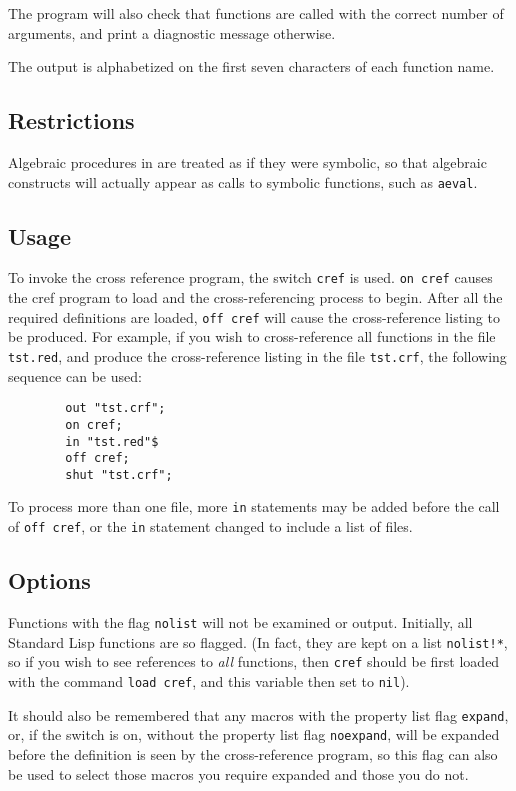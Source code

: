 The program will also check that functions are called with the correct
number of arguments, and print a diagnostic message otherwise.

The output is alphabetized on the first seven characters of each function
name.

\subsection{Restrictions}

Algebraic procedures in {\REDUCE} are treated as if they were symbolic, so
that algebraic constructs will actually appear as calls to symbolic
functions, such as \texttt{aeval}.

\subsection{Usage}

To invoke the cross reference program, the switch \texttt{cref}
 is used. \texttt{on cref} causes the cref program to load
and the cross-referencing process to begin.  After all the required
definitions are loaded, \texttt{off cref} will cause the cross-reference
listing to be produced.  For example, if you wish to cross-reference all
functions in the file \texttt{tst.red}, and produce the cross-reference
listing in the file \texttt{tst.crf}, the following sequence can be used:
\begin{verbatim}
        out "tst.crf";
        on cref;
        in "tst.red"$
        off cref;
        shut "tst.crf";
\end{verbatim}
To process more than one file, more \texttt{in} statements may be added
before the call of \texttt{off cref}, or the \texttt{in} statement changed to
include a list of files.

\subsection{Options}

Functions with the flag \texttt{nolist} will not be examined or output.
Initially, all Standard Lisp functions are so flagged. (In fact, they are
kept on a list \texttt{nolist!*}, so if you wish to see references to 
\emph{all} functions, then \texttt{cref} should be first loaded with the command \texttt{load cref}, and this variable then set to \texttt{nil}).

It should also be remembered that any macros with the property list flag
\texttt{expand}, or, if the switch  is on, without the property
list flag \texttt{noexpand}, will be expanded before the definition is seen
by the cross-reference program, so this flag can also be used to select
those macros you require expanded and those you do not.

